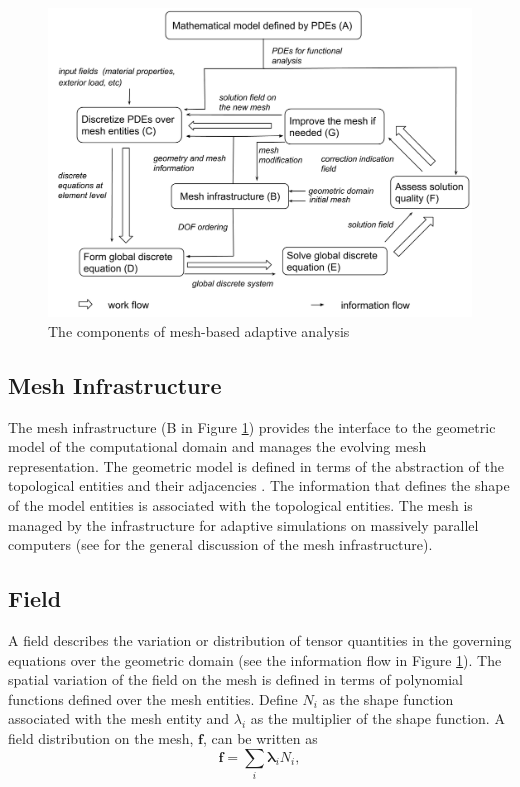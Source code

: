 \documentclass[11pt]{article}  %
\begin{document}
\begin{figure}[hbt]
\center
\includegraphics[width=5.5in]{fig/FEMStructure.png}
\caption{\small{The components of mesh-based adaptive analysis}} 
\label{fig:femstructure}
\end{figure}

\subsection{Mesh Infrastructure}
The mesh infrastructure (B in Figure \ref{fig:femstructure}) provides the interface to the geometric model of the computational domain and manages the evolving mesh representation. The geometric model is defined in terms of the abstraction of the topological entities and their adjacencies \cite{weiler1986topo}. The information that defines the shape of the model entities is associated with the topological entities. The mesh is managed by the infrastructure for adaptive simulations on massively parallel computers (see \cite{Seol2014} for the general discussion of the mesh infrastructure). 

\subsection{Field}
A field describes the variation or distribution of tensor quantities in the governing equations over the geometric domain (see the information flow in Figure \ref{fig:femstructure}). The spatial variation of the field on the mesh is defined in terms of polynomial functions defined over the mesh entities. 
Define $N_i$ as the shape function associated with the mesh entity and $\lambda_i$ as the multiplier of the shape function. A field distribution on the mesh, $\mathbf{f}$, can be written as
\begin{equation}
\mathbf{f}=\sum_i\mathbf{\lambda}_iN_i,
\end{equation}
\end{document}
